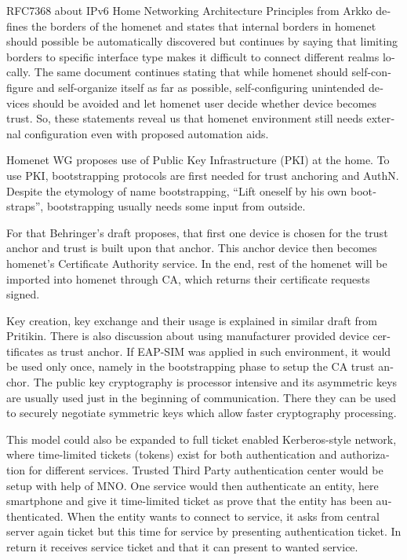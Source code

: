 \documentclass[12pt,a4paper,english]{tutthesis}
\begin{document}
\begin{otherlanguage}{english}
RFC7368 about IPv6 Home Networking Architecture Principles from
Arkko \cite{rfc7368} defines the borders of the homenet and states that
internal borders in homenet should possible be automatically
discovered but continues by saying that limiting borders to specific
interface type makes it difficult to connect different realms locally.
The same document continues stating
that while homenet should self-configure and self-organize itself as
far as possible, self-configuring unintended devices should be
avoided and let homenet user decide whether device becomes trust.
So, these statements reveal us that homenet environment still needs
external configuration even with proposed automation aids.






Homenet WG proposes use of Public Key Infrastructure (PKI) at the home. To use PKI, bootstrapping
protocols are first needed for trust anchoring and AuthN.  
Despite the etymology  of name bootstrapping, ``Lift oneself by his own bootstraps'', 
bootstrapping usually needs some input from outside. 

For that Behringer's draft \cite{draft-behringer-bootstrap} proposes,
that first one device is chosen for the trust anchor and trust is
built upon that anchor. This anchor device then becomes homenet's
Certificate Authority service. In the end, rest of the homenet will be
imported into homenet through CA, which returns their certificate
requests signed.


Key creation, key exchange and their usage is explained in similar
draft from Pritikin\cite{draft-pritikin-bootstrap}. There is also discussion about using
manufacturer provided device certificates as trust anchor.  If EAP-SIM
was applied in such environment, it would be used only once, namely in
the bootstrapping phase to setup the CA trust anchor.  The public key
cryptography is processor intensive and its asymmetric keys are
usually used just in the beginning of communication. There they can be
used to securely negotiate symmetric keys which allow faster
cryptography processing. 


This model could also be expanded to full ticket enabled
Kerberos-style network, where time-limited tickets (tokens) exist for
both authentication and authorization for different services. Trusted
Third Party authentication center would be setup with help of MNO.
One service would then authenticate an entity, here smartphone and
give it time-limited ticket as prove that the entity has been authenticated.
When the entity wants to connect to service, it asks from central 
server again ticket but this time for service by presenting
authentication ticket. In return it receives service ticket and that
it can present to wanted service.







\end{otherlanguage}
\end{document}
